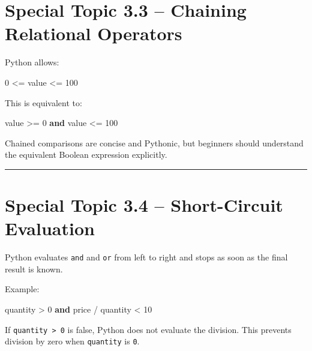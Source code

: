 \documentclass[
  11pt,
  a4paper,
]{article}
\newenvironment{Shaded}{}{}
\newcommand{\DecValTok}[1]{\textcolor[rgb]{0.25,0.63,0.44}{#1}}
\newcommand{\KeywordTok}[1]{\textcolor[rgb]{0.00,0.44,0.13}{\textbf{#1}}}
\newcommand{\NormalTok}[1]{#1}
\newcommand{\OperatorTok}[1]{\textcolor[rgb]{0.40,0.40,0.40}{#1}}
\begin{document}
\section{Special Topic 3.3 -- Chaining Relational
Operators}\label{special-topic-3.3-chaining-relational-operators}

Python allows:

\begin{Shaded}
\begin{Highlighting}[]
\DecValTok{0} \OperatorTok{\textless{}=}\NormalTok{ value }\OperatorTok{\textless{}=} \DecValTok{100}
\end{Highlighting}
\end{Shaded}

This is equivalent to:

\begin{Shaded}
\begin{Highlighting}[]
\NormalTok{value }\OperatorTok{\textgreater{}=} \DecValTok{0} \KeywordTok{and}\NormalTok{ value }\OperatorTok{\textless{}=} \DecValTok{100}
\end{Highlighting}
\end{Shaded}

Chained comparisons are concise and Pythonic, but beginners should
understand the equivalent Boolean expression explicitly.

\begin{center}\rule{0.5\linewidth}{0.5pt}\end{center}

\section{Special Topic 3.4 -- Short-Circuit
Evaluation}\label{special-topic-3.4-short-circuit-evaluation}

Python evaluates \texttt{and} and \texttt{or} from left to right and
stops as soon as the final result is known.

Example:

\begin{Shaded}
\begin{Highlighting}[]
\NormalTok{quantity }\OperatorTok{\textgreater{}} \DecValTok{0} \KeywordTok{and}\NormalTok{ price }\OperatorTok{/}\NormalTok{ quantity }\OperatorTok{\textless{}} \DecValTok{10}
\end{Highlighting}
\end{Shaded}

If \texttt{quantity\ \textgreater{}\ 0} is false, Python does not
evaluate the division. This prevents division by zero when
\texttt{quantity} is \texttt{0}.
\end{document}
